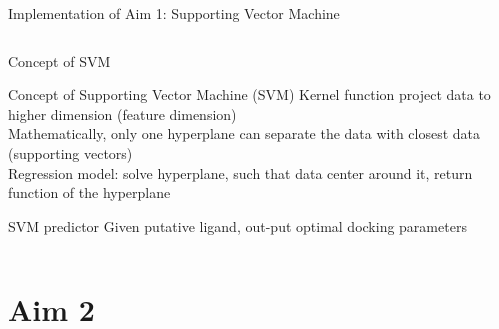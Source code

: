 \begin{frame}{Implementation of Aim 1: Supporting Vector Machine}
\begin{columns}
\begin{column}{0.55\textwidth}
      {\scriptsize Concept of SVM}
\begin{block}{Concept of Supporting Vector Machine (SVM)}
Kernel function project data to higher dimension (feature dimension)\\
Mathematically, only one hyperplane can separate the data with closest data (supporting vectors)\\
Regression model: solve hyperplane, such that data center around it, return function of the hyperplane
\end{block}
\begin{block}{SVM predictor}
Given putative ligand, out-put optimal docking parameters
\end{block}
    \end{column}
    \end{columns} 
\end{frame}

\section{Aim 2}
